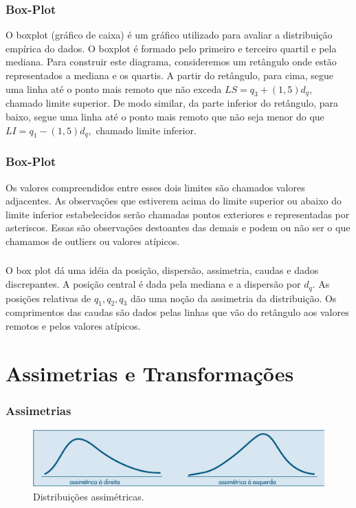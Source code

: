 \documentclass[14pt,aspectratio=1610]{beamer}
\begin{document}
\begin{frame}{}
\frametitle{Box-Plot}
\begin{block}{}
\justifying
O boxplot (gráfico de caixa) é um gráfico utilizado para avaliar a distribuição empírica do dados. O boxplot é formado pelo primeiro e terceiro quartil e pela mediana. Para construir este diagrama, consideremos um retângulo onde estão representados a mediana e os quartis. A partir do retângulo, para cima, segue uma linha até o ponto mais remoto que não exceda $LS = q_{3} + (1,5)d_{q},$ chamado limite superior. De modo similar, da parte inferior do retângulo, para baixo, segue uma linha até o ponto mais remoto que não seja menor do que 
$LI = q_{1}-(1,5)d_{q},$ chamado limite inferior.
\end{block}
\end{frame}

\begin{frame}{}
\frametitle{Box-Plot}
\begin{block}{}
\justifying
Os valores compreendidos entre esses dois limites são chamados valores adjacentes. As observações que estiverem acima do limite superior ou abaixo do limite inferior estabelecidos serão chamadas pontos exteriores e representadas por asteriscos. Essas são observações destoantes das demais e
podem ou não ser o que chamamos de outliers ou valores atípicos.
\end{block}
\end{frame}

\begin{frame}{}
\frametitle{}
\begin{block}{}
\justifying
O box plot dá uma idéia da posição, dispersão, assimetria, caudas e dados discrepantes.
A posição central é dada pela mediana e a dispersão por $d_{q}.$ As posições relativas de $q_{1}, q_{2}, q_{3}$
dão uma noção da assimetria da distribuição. Os comprimentos das caudas são dados pelas
linhas que vão do retângulo aos valores remotos e pelos valores atípicos.
\end{block}
\end{frame}

\section{Assimetrias e Transformações}
\begin{frame}{}
\frametitle{Assimetrias}
\begin{figure}[H]
    \centering
    \includegraphics[height=0.4\textwidth,width=15cm]{Fig10}
    \caption{Distribuições assimétricas.}
    \label{Fig10_ex}
  \end{figure}
\end{frame}
\end{document}
